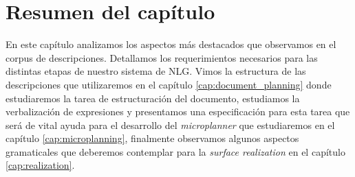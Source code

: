\section{Resumen del capítulo}
En este capítulo analizamos los aspectos más destacados que observamos en el corpus de descripciones. Detallamos los requerimientos necesarios para las distintas etapas de nuestro sistema de NLG. Vimos la estructura de las descripciones que utilizaremos en el capítulo \ref{cap:document_planning} donde estudiaremos la tarea de estructuración del documento, estudiamos la verbalización de expresiones y presentamos una especificación para esta tarea que será de vital ayuda para el desarrollo del \emph{microplanner} que estudiaremos en el capítulo \ref{cap:microplanning}, finalmente observamos algunos aspectos gramaticales que deberemos contemplar para la \textit{surface realization} en el capítulo \ref{cap:realization}.

